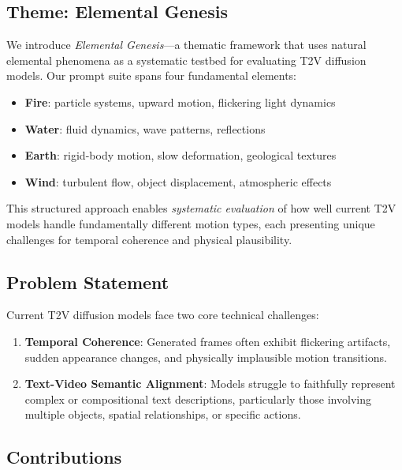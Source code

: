 \documentclass[conference]{IEEEtran}
\begin{document}
\subsection{Theme: Elemental Genesis}

We introduce \textit{Elemental Genesis}---a thematic framework that uses natural elemental phenomena as a systematic testbed for evaluating T2V diffusion models. Our prompt suite spans four fundamental elements:

\begin{itemize}
    \item \textbf{Fire}: particle systems, upward motion, flickering light dynamics
    \item \textbf{Water}: fluid dynamics, wave patterns, reflections
    \item \textbf{Earth}: rigid-body motion, slow deformation, geological textures
    \item \textbf{Wind}: turbulent flow, object displacement, atmospheric effects
\end{itemize}

This structured approach enables \textit{systematic evaluation} of how well current T2V models handle fundamentally different motion types, each presenting unique challenges for temporal coherence and physical plausibility.

\subsection{Problem Statement}

Current T2V diffusion models face two core technical challenges:
\begin{enumerate}
    \item \textbf{Temporal Coherence}: Generated frames often exhibit flickering artifacts, sudden appearance changes, and physically implausible motion transitions.
    \item \textbf{Text-Video Semantic Alignment}: Models struggle to faithfully represent complex or compositional text descriptions, particularly those involving multiple objects, spatial relationships, or specific actions.
\end{enumerate}

\subsection{Contributions}
\end{document}
